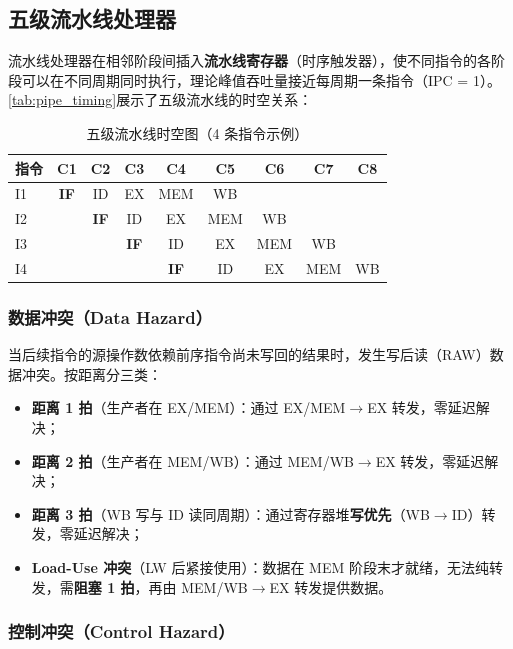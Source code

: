 \documentclass[12pt,hyperref,a4paper,UTF8]{ctexart}
\begin{document}
\subsection{五级流水线处理器}

流水线处理器在相邻阶段间插入\textbf{流水线寄存器}（时序触发器），使不同指令的各阶段可以在不同周期同时执行，理论峰值吞吐量接近每周期一条指令（IPC = 1）。\autoref{tab:pipe_timing}展示了五级流水线的时空关系：

\begin{table}[H]
    \centering
    \caption{五级流水线时空图（4 条指令示例）}
    \label{tab:pipe_timing}
    \begin{tabular}{lcccccccc}
        \toprule
        指令 & C1 & C2 & C3 & C4 & C5 & C6 & C7 & C8 \\
        \midrule
        I1 & \textbf{IF} & ID & EX & MEM & WB & & & \\
        I2 & & \textbf{IF} & ID & EX & MEM & WB & & \\
        I3 & & & \textbf{IF} & ID & EX & MEM & WB & \\
        I4 & & & & \textbf{IF} & ID & EX & MEM & WB \\
        \bottomrule
    \end{tabular}
\end{table}

\subsubsection{数据冲突（Data Hazard）}

当后续指令的源操作数依赖前序指令尚未写回的结果时，发生写后读（RAW）数据冲突。按距离分三类：

\begin{itemize}[leftmargin=2em]
    \item \textbf{距离 1 拍}（生产者在 EX/MEM）：通过 EX/MEM$\rightarrow$EX 转发，零延迟解决；
    \item \textbf{距离 2 拍}（生产者在 MEM/WB）：通过 MEM/WB$\rightarrow$EX 转发，零延迟解决；
    \item \textbf{距离 3 拍}（WB 写与 ID 读同周期）：通过寄存器堆\textbf{写优先}（WB$\rightarrow$ID）转发，零延迟解决；
    \item \textbf{Load-Use 冲突}（LW 后紧接使用）：数据在 MEM 阶段末才就绪，无法纯转发，需\textbf{阻塞 1 拍}，再由 MEM/WB$\rightarrow$EX 转发提供数据。
\end{itemize}

\subsubsection{控制冲突（Control Hazard）}
\end{document}
